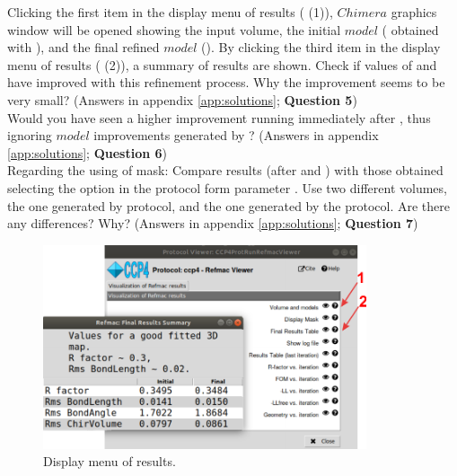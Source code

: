   Clicking the first item in the display menu of results ( (1)), $Chimera$ graphics window will be opened showing the input volume, the initial $model$ ( obtained with \phenix {}), and the final  refined $model$ (). By clicking the third item in the display menu of results ( (2)), a summary of  results are shown. Check if values of  and  have improved with this refinement process. Why the improvement seems to be very small? (Answers in appendix \ref{app:solutions}; \textbf{Question 5})\\
  
  Would you have seen a higher improvement running  immediately after \coot, thus ignoring $model$ improvements generated by \phenix {}? (Answers in appendix \ref{app:solutions}; \textbf{Question 6})\\
  
  Regarding the using of mask: Compare  results (after \coot and \phenix {}) with those obtained selecting the option  in the protocol form parameter . Use two different volumes, the one generated by \coot protocol, and the one generated by the  protocol. Are there any differences? Why? (Answers in appendix \ref{app:solutions}; \textbf{Question 7})\\
  
  \begin{figure}[H]
  \centering 
  \captionsetup{width=.7\linewidth} 
  \includegraphics[width=0.85\textwidth]{Images/Fig32}
  \caption{Display menu of  results.}
  \label{fig:refmac_display_results}
  \end{figure}
  
